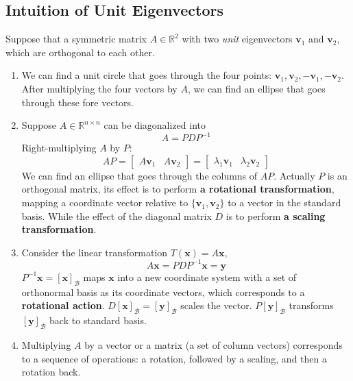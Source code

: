     \subsection{Intuition of Unit Eigenvectors}
    Suppose that a symmetric matrix $A\in\mathbb{R}^2$ with two \textit{unit} eigenvectors $\mathbf{v}_1$ and $\mathbf{v}_2$, which are orthogonal to each other.
    \begin{enumerate}
    \item 
     We can find a unit circle that goes through the four points: $\mathbf{v}_1, \mathbf{v}_2, -\mathbf{v}_1, -\mathbf{v}_2$. After multiplying the four vectors by $A$, we can find an ellipse that goes through these fore vectors.
    \item Suppose $A\in\mathbb{R}^{n\times n}$ can be diagonalized into 
    \begin{equation*}
        A = PDP^{-1}
    \end{equation*}
    Right-multiplying $A$ by $P$:
    \begin{equation*}
        AP =  \begin{bmatrix}
            A\mathbf{v}_1 & A\mathbf{v}_2 
        \end{bmatrix} = 
        \begin{bmatrix}
            \lambda_1\mathbf{v}_1 & \lambda_2\mathbf{v}_2
        \end{bmatrix}
    \end{equation*}
    We can find an ellipse that goes through the columns of $AP$. Actually $P$ is an orthogonal matrix, its effect is to perform \textbf{a rotational transformation}, mapping a coordinate vector relative to $\{\mathbf{v}_1, \mathbf{v}_2 \}$ to a vector in the standard basis. While the effect of the diagonal matrix $D$ is to perform \textbf{a scaling transformation}.
    \item Consider the linear transformation $T(\mathbf{x}) = A\mathbf{x}$,
    \begin{equation*}
        A\mathbf{x} = PDP^{-1}\mathbf{x} = \mathbf{y}
    \end{equation*}
    $P^{-1}\mathbf{x} = [\mathbf{x}]_{\mathcal{B}}$ maps $\mathbf{x}$ into a new coordinate system with a set of orthonormal basis as its coordinate vectors, which corresponds to a \textbf{rotational action}. $D[\mathbf{x}]_{\mathcal{B}} = [\mathbf{y}]_{\mathcal{B}}$ scales the vector. $P[\mathbf{y}]_{\mathcal{B}}$ transforms $[\mathbf{y}]_{\mathcal{B}}$ back to standard basis.  

    \item Multiplying $A$ by a vector or a matrix (a set of column vectors) corresponds to a sequence of operations: a rotation, followed by a scaling, and then a rotation back.
    \end{enumerate} 

